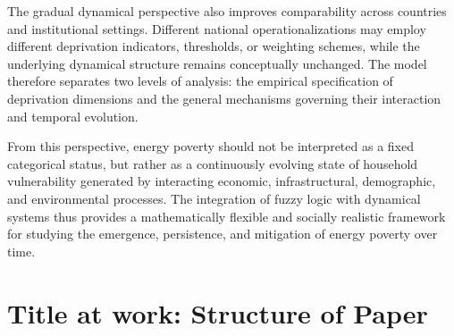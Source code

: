\documentclass[11pt,a4paper]{article}
\begin{document}
The gradual dynamical perspective also improves comparability across countries and institutional settings. Different national operationalizations may employ different deprivation indicators, thresholds, or weighting schemes, while the underlying dynamical structure remains conceptually unchanged. The model therefore separates two levels of analysis: the empirical specification of deprivation dimensions and the general mechanisms governing their interaction and temporal evolution.

From this perspective, energy poverty should not be interpreted as a fixed categorical status, but rather as a continuously evolving state of household vulnerability generated by interacting economic, infrastructural, demographic, and environmental processes. The integration of fuzzy logic with dynamical systems thus provides a mathematically flexible and socially realistic framework for studying the emergence, persistence, and mitigation of energy poverty over time.

\section{Title at work: Structure of Paper}


\end{document}
